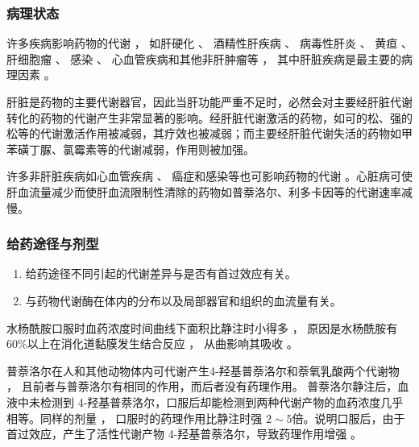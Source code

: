 \documentclass[dvipsnames, svgnames, x11names]{beamer}
\begin{document}
\begin{frame}
    \frametitle{病理状态}
    许多疾病影响药物的代谢 ， 如肝硬化 、 酒精性肝疾病 、 病毒性肝炎 、 黄疸 、 肝细胞瘤 、 感染 、 心血管疾病和其他非肝肿瘤等 ， 其中肝脏疾病是最主要的病理因素 。
    \begin{blankblock}{}
      肝脏是药物的主要代谢器官，因此当肝功能严重不足时，必然会对主要经肝脏代谢转化的药物的代谢产生非常显著的影响。经肝脏代谢激活的药物，如可的松、强的松等的代谢激活作用被减弱，其疗效也被减弱；而主要经肝脏代谢失活的药物如甲苯磺丁脲、氯霉素等的代谢减弱，作用则被加强。
    \end{blankblock}
    \begin{blankblock}{}
      许多非肝脏疾病如心血管疾病 、 癌症和感染等也可影响药物的代谢 。心脏病可使肝血流量减少而使肝血流限制性清除的药物如普萘洛尔、利多卡因等的代谢速率减慢。
    \end{blankblock}
\end{frame}


\begin{frame}
    \frametitle{给药途径与剂型}
    \begin{enumerate}
      \item 给药途径不同引起的代谢差异与是否有首过效应有关。
      \item 与药物代谢酶在体内的分布以及局部器官和组织的血流量有关。
    \end{enumerate}
    \begin{blankblock}{}
      水杨酰胺口服时血药浓度时间曲线下面积比静注时小得多 ， 原因是水杨酰胺有 60\%以上在消化道黏膜发生结合反应 ， 从曲影响其吸收 。
    \end{blankblock}
    \begin{blankblock}{}
      普萘洛尔在人和其他动物体内可代谢产生4-羟基普萘洛尔和萘氧乳酸两个代谢物 ， 且前者与普萘洛尔有相同的作用，而后者没有药理作用。 普萘洛尔静注后，血液中未检测到 4-羟基普萘洛尔，口服后却能检测到两种代谢产物的血药浓度几乎相等。同样的剂量 ， 口服时的药理作用比静注时强 $2\sim 5$倍。说明口服后，由于首过效应，产生了活性代谢产物 4-羟基普萘洛尔，导致药理作用增强 。
    \end{blankblock}
\end{frame}
\end{document}

